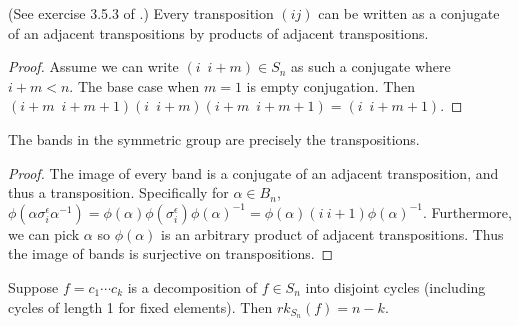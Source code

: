 \documentclass[12pt]{thesis}
\begin{document}
\begin{lemma}
    (See exercise 3.5.3 of \cite{dummit-and-foote}.)
    Every transposition $(i j)$ can be written
    as a conjugate of an adjacent transpositions
    by products of adjacent transpositions. 
\end{lemma}

\begin{proof}
    Assume we can write $(i\enspace  i + m) \in S_{n}$ as such a conjugate where $i + m < n$.
    The base case when $m = 1$ is empty conjugation.
    Then $(i + m\enspace i + m + 1) (i\enspace i + m) (i + m\enspace i + m + 1) = (i\enspace i + m + 1)$.
\end{proof}

\begin{proposition}
    \label{prop:bands-are-transpositions}
    The bands in the symmetric group are precisely the transpositions.
\end{proposition}

\begin{proof}
    The image of every band
    is a conjugate of an adjacent transposition,
    and thus a transposition.
    Specifically for $\alpha \in B_{n}$,
    $\phi(\alpha\sigma_{i}^{\epsilon}\alpha^{-1}) = \phi(\alpha)\phi(\sigma_{i}^{\epsilon})\phi(\alpha)^{-1} = \phi(\alpha) (i\ i+1) \phi(\alpha)^{-1}$.
    Furthermore, we can pick $\alpha$ so $\phi(\alpha)$ is an arbitrary
    product of adjacent transpositions.
    Thus the image of bands is surjective on transpositions.
\end{proof}

\begin{proposition}
    Suppose $f = c_{1} \cdots c_{k}$ is a decomposition
    of $f \in S_{n}$ into disjoint cycles (including cycles of length 1 for fixed elements).
    Then $rk_{S_{n}}(f) = n - k$.
\end{proposition}
\end{document}
